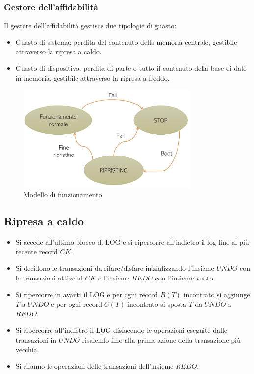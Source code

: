 \documentclass[oneside,a4paper,11pt]{book}
\theoremstyle{italicstyle}
\theoremstyle{normStyle}
\begin{document}
\subsubsection{Gestore dell'affidabilità}
Il gestore dell'affidabilità gestisce due tipologie di guasto:
\begin{itemize}
    \item Guasto di sistema: perdita del contenuto della memoria centrale, gestibile attraverso
    la ripresa a caldo.
    \item Guasto di dispositivo: perdita di parte o tutto il contenuto 
    della base di dati in memoria, gestibile attraverso la ripresa a freddo.
\end{itemize}
\begin{figure}[H]
    \centering
    \includegraphics[width=9cm]{img/modelloAffidabilita.jpeg}
    \caption{Modello di funzionamento}
    \label{fig:Modelloaffidabilita}
\end{figure}
\subsection{Ripresa a caldo}
\begin{itemize}
    \item Si accede all'ultimo blocco di LOG e si ripercorre all'indietro il log 
    fino al più recente record $CK$.
    \item Si decidono le transazioni da rifare/disfare inizializzando l'insieme $UNDO$ con 
    le transazioni attive al $CK$ e l'insieme $REDO$ con l'insieme vuoto.
    \item Si ripercorre in avanti il LOG e per ogni record $B(T)$ incontrato 
    si aggiunge $T$ a $UNDO$ e per ogni record $C(T)$ incontrato si sposta $T$ da $UNDO$ a $REDO$.
    \item Si ripercorre all’indietro il LOG disfacendo le operazioni eseguite dalle transazioni in 
    $UNDO$ risalendo fino alla prima azione della transazione più vecchia.
    \item Si rifanno le operazioni delle transazioni dell'insieme $REDO$.
\end{itemize}
\end{document}
